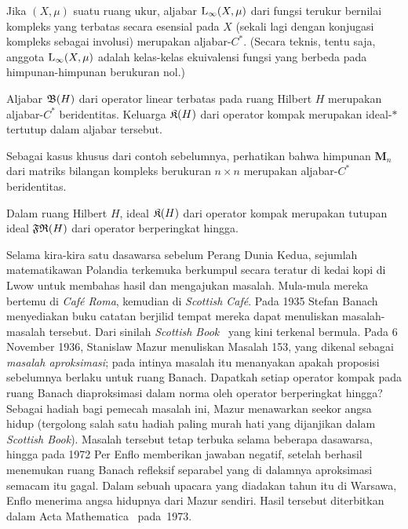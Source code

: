 \begin{exam} Jika $(X,\mu)$ suatu ruang ukur, aljabar $\mathrm{L_{\infty}}(X,\mu)$ dari
fungsi terukur bernilai kompleks yang terbatas secara esensial pada $X$ (sekali lagi dengan konjugasi
kompleks sebagai involusi) merupakan aljabar-$C^*$.  (Secara teknis, tentu saja, anggota
$\mathrm{L_{\infty}}(X,\mu)$ adalah kelas-kelas ekuivalensi fungsi yang berbeda pada himpunan-himpunan berukuran nol.)
\end{exam}

\begin{exam}\label{001305fa} Aljabar $\mathfrak{B}(H)$ dari operator linear terbatas pada ruang Hilbert
$H$ merupakan aljabar-$C^*$ beridentitas.  Keluarga $\mathfrak{K}(H)$ dari operator kompak merupakan ideal-$*\,$ tertutup
dalam aljabar tersebut.
\end{exam}

\begin{exam}\label{001306} Sebagai kasus khusus dari contoh sebelumnya, perhatikan bahwa himpunan
$\mathbf M_n$ dari matriks bilangan kompleks berukuran $n \times n$ merupakan aljabar-$C^*$ beridentitas.
\end{exam}

\begin{prop}\label{prop_K_is_clo_FR} Dalam ruang Hilbert $H$, ideal $\mathfrak{K}(H)$ dari operator kompak merupakan tutupan
ideal $\mathfrak{FR}(H)$ dari operator berperingkat hingga.
\end{prop}

Selama kira-kira satu dasawarsa sebelum Perang Dunia Kedua, sejumlah matematikawan Polandia terkemuka berkumpul secara teratur di kedai
kopi di Lwow untuk membahas hasil dan mengajukan masalah.  Mula-mula mereka bertemu di \emph{Caf\'e Roma}, kemudian di
\emph{Scottish Caf\'e}.  Pada 1935 Stefan Banach menyediakan buku catatan berjilid tempat mereka dapat menuliskan masalah-masalah tersebut.
Dari sinilah \emph{Scottish Book}~\cite{Mauldin:1981} yang kini terkenal bermula.  Pada 6 November 1936, Stanislaw Mazur
menuliskan Masalah 153, yang dikenal sebagai \emph{masalah aproksimasi}; pada intinya masalah itu menanyakan apakah proposisi sebelumnya
berlaku untuk ruang Banach.  Dapatkah setiap operator kompak pada ruang Banach diaproksimasi dalam norma oleh operator berperingkat hingga?
Sebagai hadiah bagi pemecah masalah ini, Mazur menawarkan seekor angsa hidup (tergolong salah satu hadiah paling murah hati yang dijanjikan dalam
\emph{Scottish Book}).  Masalah tersebut tetap terbuka selama beberapa dasawarsa, hingga pada 1972 Per Enflo memberikan jawaban negatif,
setelah berhasil menemukan ruang Banach refleksif separabel yang di dalamnya aproksimasi semacam itu gagal.  Dalam sebuah upacara yang diadakan
tahun itu di Warsawa, Enflo menerima angsa hidupnya dari Mazur sendiri.  Hasil tersebut diterbitkan dalam Acta
Mathematica~\cite{Enflo:1973} pada~1973.

